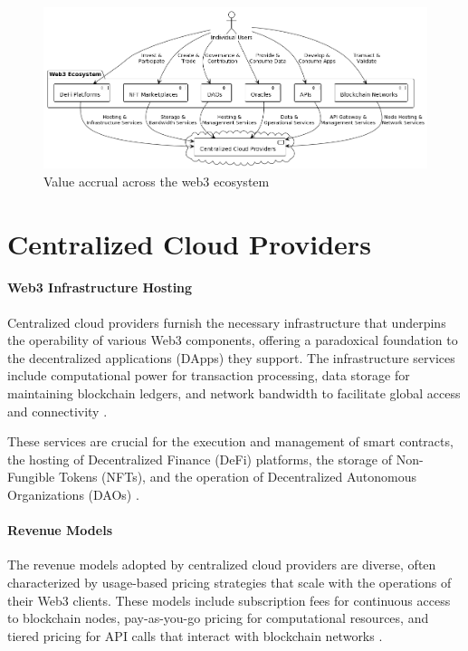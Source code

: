 \documentclass{article}
\begin{document}
\begin{figure}[h]
  \centering
  \includegraphics[scale=0.4]{diagram11}
  \caption{Value accrual across the web3 ecosystem}
\end{figure}

\section{Centralized Cloud Providers}

\paragraph{Web3 Infrastructure Hosting} Centralized cloud providers furnish the necessary infrastructure that underpins the operability of various Web3 components, offering a paradoxical foundation to the decentralized applications (DApps) they support. The infrastructure services include computational power for transaction processing, data storage for maintaining blockchain ledgers, and network bandwidth to facilitate global access and connectivity \cite{zheng2018blockchain}. 

These services are crucial for the execution and management of smart contracts, the hosting of Decentralized Finance (DeFi) platforms, the storage of Non-Fungible Tokens (NFTs), and the operation of Decentralized Autonomous Organizations (DAOs) \cite{christidis2016blockchains}.

\paragraph{Revenue Models} The revenue models adopted by centralized cloud providers are diverse, often characterized by usage-based pricing strategies that scale with the operations of their Web3 clients. These models include subscription fees for continuous access to blockchain nodes, pay-as-you-go pricing for computational resources, and tiered pricing for API calls that interact with blockchain networks \cite{mazieres2019stellar}. 
\end{document}
